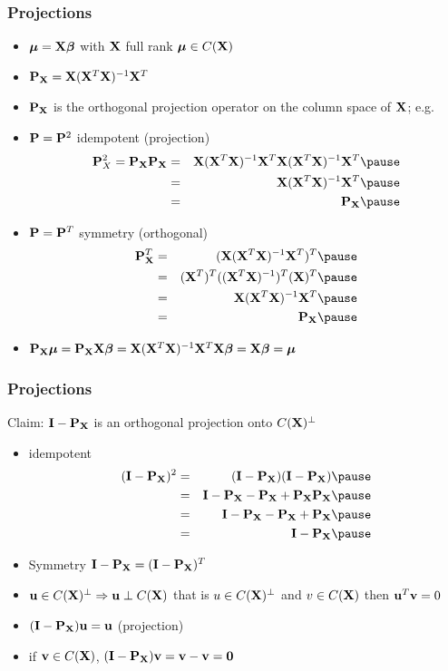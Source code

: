 \documentclass[handout]{beamer}
\begin{document}
\begin{frame} \frametitle{Projections}
  \begin{itemize}
\item $\mub = \X \b$ with $\X$ full rank $\mub \in C(\X)$
\item $\P_\X = \X (\X^T\X)^{-1} \X^T$
\item $\P_\X$ is the orthogonal projection operator on the column
  space of $\X$; e.g.
\item $\P = \P^2$  idempotent (projection)  \pause
  \begin{eqnarray*}
 \P_X^2 = \P_\X \P_\X & = &\X(\X^T\X)^{-1} \X^T\X(\X^T\X)^{-1} \X^T   \pause \\
             & = & \X(\X^T\X)^{-1}\X^T \pause\\
 & = & \P_{\X} \pause
  \end{eqnarray*}
\item $\P = \P^T$ symmetry (orthogonal) \pause
 \begin{eqnarray*}
 \P_\X^T  & = & (\X(\X^T\X)^{-1}\X^T)^T \pause \\
             & = & (\X^T)^T((\X^T\X)^{-1})^T(\X)^T \pause \\
 & = &  \X(\X^T\X)^{-1}\X^T \pause \\
 & = & \P_{\X} \pause
  \end{eqnarray*}
\item $\P_{\X} \mub = \P_{\X} \X \b = \X(\X^T\X)^{-1}\X^T
  \X \b = \X\b = \mub$
\end{itemize}
\end{frame}

\begin{frame} \frametitle{Projections}
  Claim: $\I - \P_\X$ is an orthogonal projection onto $C(\X)^{\perp}$ \pause
  \begin{itemize}
  \item idempotent  \pause
    \begin{eqnarray*}
(\I - \P_{\X})^2 &= & (\I - \P_\X)(\I - \P_\X)  \pause \\
& = & \I - \P_\X - \P_\X + \P_\X \P_\X       \pause \\
& = & \I - \P_\X -\P_\X + \P_\X  \pause\\
& = & \I - \P_\X  \pause
    \end{eqnarray*}
\item Symmetry $\I - \P_\X = (\I - \P_\X)^T$  \pause
\item $\u \in C(\X)^{\perp} \Rightarrow \u \perp C(\X)$ that is $u \in
  C(\X)^{\perp}$ and $v \in C(\X)$ then $\u^T\v = 0$

\item $(\I -\P_\X) \u  = \u$  (projection)  \pause
\item if $\v \in C(\X)$, $(\I - \P_\X ) \v = \v - \v = \zero$
  \end{itemize}
\end{frame}
\end{document}
